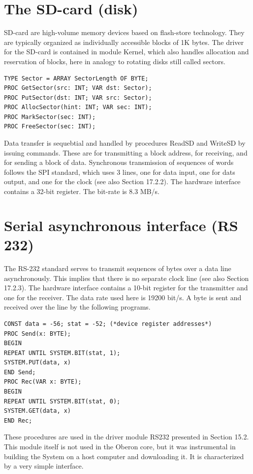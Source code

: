 \section{The SD-card (disk)}
SD-card are high-volume memory devices based on flash-store technology. They are typically
organized as individually accessible blocks of 1K bytes. The driver for the SD-card is contained in
module Kernel, which also handles allocation and reservation of blocks, here in analogy to rotating
disks still called sectors.
\begin{verbatim}
TYPE Sector = ARRAY SectorLength OF BYTE;
PROC GetSector(src: INT; VAR dst: Sector);
PROC PutSector(dst: INT; VAR src: Sector);
PROC AllocSector(hint: INT; VAR sec: INT);
PROC MarkSector(sec: INT);
PROC FreeSector(sec: INT);
\end{verbatim}

Data transfer is sequebtial and handled by procedures ReadSD and WriteSD by issuing
commands. These are for transmitting a block address, for receiving, and for sending a block of
data. Synchronous transmission of sequences of words follows the SPI standard, which uses 3
lines, one for data input, one for dats output, and one for the clock (see also Section 17.2.2). The
hardware interface contains a 32-bit register. The bit-rate is 8.3 MB/s.

\section{Serial asynchronous interface (RS 232)}
The RS-232 standard serves to transmit sequences of bytes over a data line asynchronously. This
implies that there is no separate clock line (see also Section 17.2.3). The hardware interface
contains a 10-bit register for the transmitter and one for the receiver. The data rate used here is
19200 bit/s. A byte is sent and received over the line by the following programs.
\begin{verbatim}
CONST data = -56; stat = -52; (*device register addresses*)
PROC Send(x: BYTE);
BEGIN
REPEAT UNTIL SYSTEM.BIT(stat, 1);
SYSTEM.PUT(data, x)
END Send;
PROC Rec(VAR x: BYTE);
BEGIN
REPEAT UNTIL SYSTEM.BIT(stat, 0);
SYSTEM.GET(data, x)
END Rec;
\end{verbatim}

These procedures are used in the driver module RS232 presented in Section 15.2. This module
itself is not used in the Oberon core, but it was instrumental in building the System on a host
computer and downloading it. It is characterized by a very simple interface.

